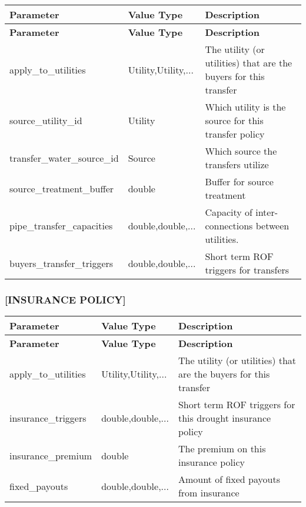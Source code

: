 \tabulinesep=1mm
\begin{longtabu} spread 0pt [c]{*{3}{|X[-1]}|}
\hline
\rowcolor{\tableheadbgcolor}\textbf{ Parameter  }&\textbf{ Value Type  }&\textbf{ Description   }\\
\endfirsthead
\hline
\endfoot
\hline
\rowcolor{\tableheadbgcolor}\textbf{ Parameter  }&\textbf{ Value Type  }&\textbf{ Description   }\\
\endhead
apply\+\_\+to\+\_\+utilities  &Utility,Utility,...  &The utility (or utilities) that are the buyers for this transfer   \\
source\+\_\+utility\+\_\+id  &Utility  &Which utility is the source for this transfer policy   \\
transfer\+\_\+water\+\_\+source\+\_\+id  &Source  &Which source the transfers utilize   \\
source\+\_\+treatment\+\_\+buffer  &double  &Buffer for source treatment   \\
pipe\+\_\+transfer\+\_\+capacities  &double,double,...  &Capacity of inter-\/connections between utilities.   \\
buyers\+\_\+transfer\+\_\+triggers  &double,double,...  &Short term R\+OF triggers for transfers   \\
\end{longtabu}


\subsubsection*{\mbox{[}I\+N\+S\+U\+R\+A\+N\+CE P\+O\+L\+I\+CY\mbox{]}}

\tabulinesep=1mm
\begin{longtabu} spread 0pt [c]{*{3}{|X[-1]}|}
\hline
\rowcolor{\tableheadbgcolor}\textbf{ Parameter  }&\textbf{ Value Type  }&\textbf{ Description   }\\
\endfirsthead
\hline
\endfoot
\hline
\rowcolor{\tableheadbgcolor}\textbf{ Parameter  }&\textbf{ Value Type  }&\textbf{ Description   }\\
\endhead
apply\+\_\+to\+\_\+utilities  &Utility,Utility,...  &The utility (or utilities) that are the buyers for this transfer   \\
insurance\+\_\+triggers  &double,double,...  &Short term R\+OF triggers for this drought insurance policy   \\
insurance\+\_\+premium  &double  &The premium on this insurance policy   \\
fixed\+\_\+payouts  &double,double,...  &Amount of fixed payouts from insurance   \\
\end{longtabu}


